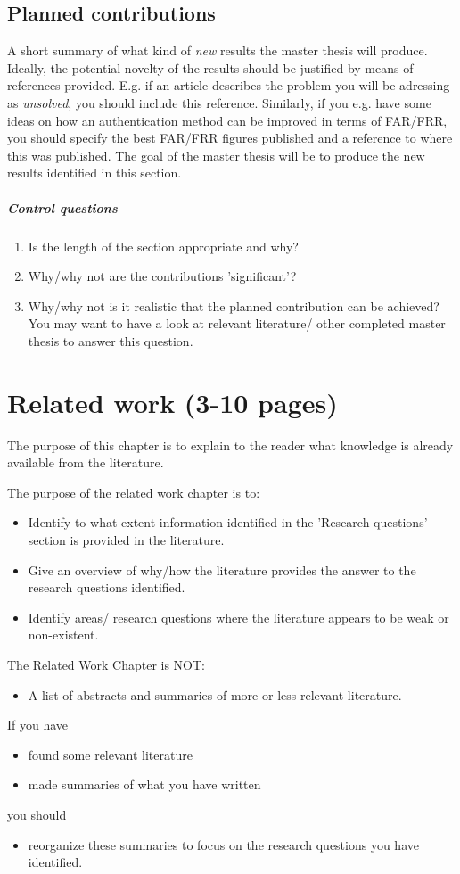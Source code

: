 \documentclass[informationsecurity]{gucmasterproject}
\begin{document}
\section{Planned contributions}
A short summary of what kind of {\em new} results the master thesis will produce.  
Ideally,  the potential novelty of the results should be justified by means of references provided.
E.g. if an article describes the problem you will be adressing as {\em unsolved},
you should include this reference.  Similarly, if you e.g. have some ideas on how an 
authentication method can be improved in terms of FAR/FRR, you should specify the best
 FAR/FRR figures published and a reference to where this was published. 
 The goal of the master thesis
will be to produce the new results identified in this section.

\paragraph{Control questions}
\begin{enumerate}
\item Is the length of the section appropriate and why?
\item Why/why not are the contributions 'significant'?
\item Why/why not is it realistic that the planned contribution can be achieved?  You may want to have a look at relevant literature/ other completed master thesis to answer this question.
\end{enumerate}

\chapter{Related work (3-10 pages)}
The purpose of this chapter
is to explain to the reader what knowledge is already
available from the literature.

The purpose of the related work chapter is to:
\begin{itemize}
\item Identify to what extent information identified in the 'Research questions'  section is provided in the literature.
\item Give an overview of why/how the literature provides the answer to the research questions identified.
\item Identify areas/ research questions where the literature appears to be weak or non-existent.
\end{itemize}
The Related Work Chapter is NOT:
\begin{itemize}
\item   A list of abstracts and summaries of more-or-less-relevant literature.
\end{itemize}
If you have
\begin{itemize}
\item   found some relevant literature
\item   made summaries of what you have written
\end{itemize}
you should
\begin{itemize}
\item reorganize these summaries to focus on the research questions you have identified.
\end{itemize}
\end{document}
